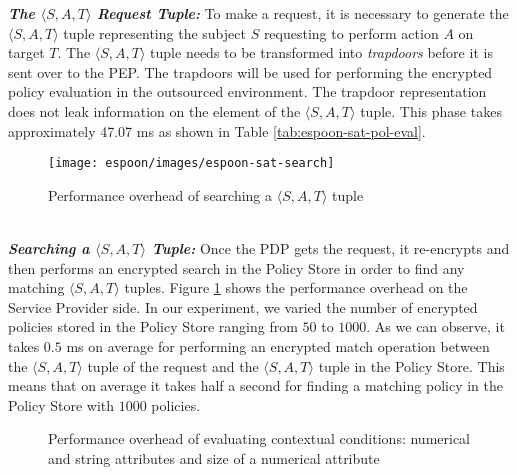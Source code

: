 \documentclass[epsfig,a4paper,11pt,titlepage]{book}
\numberwithin{algorithm}{chapter}
\begin{document}
\noindent \emph{\textbf{The $\langle S, A, T \rangle$ Request Tuple:}}
To make a request, it is necessary to generate the $\langle S, A, T \rangle$ tuple representing the subject $S$ requesting to perform action $A$ on target $T$. The $\langle S, A, T \rangle$ tuple needs to be transformed into \emph{trapdoors} before it is sent over to the \gls{PEP}. The trapdoors will be used for performing the encrypted policy evaluation in the outsourced environment. The trapdoor representation does not leak information on the element of the $\langle S, A, T \rangle$ tuple. This phase takes approximately 47.07 \gls{ms} as shown in Table \ref{tab:espoon-sat-pol-eval}.

\begin{figure}[htp]
\centering
\texttt{[image: espoon/images/espoon-sat-search]}
\caption{Performance overhead of searching a $\langle S, A, T \rangle$ tuple}
\label{fig:espoon-sat-search}
\end{figure}
\noindent \\
\noindent \emph{\textbf{Searching a $\langle S, A, T \rangle$ Tuple:}}
Once the \gls{PDP} gets the request, it re-encrypts and then performs an encrypted search in the Policy Store in order to find any matching $\langle S, A, T \rangle$ tuples. Figure \ref{fig:espoon-sat-search} shows the performance overhead on the Service Provider side. In our experiment, we varied the number of encrypted policies stored in the Policy Store ranging from $50$ to $1000$. As we can observe, it takes $0.5$ \gls{ms} on average for performing an encrypted match operation between the $\langle S, A, T \rangle$ tuple of the request and the $\langle S, A, T \rangle$ tuple in the Policy Store. This means that on average it takes half a second for finding a matching policy in the Policy Store with $1000$ policies.


\begin{figure} [htp]
\centering
{}
\caption[Performance overhead of evaluating contextual conditions]{Performance overhead of evaluating contextual conditions:  numerical and string attributes and  size of a numerical attribute}
\label{fig:erbac-policy-evaluation-context}
\end{figure}
\end{document}
